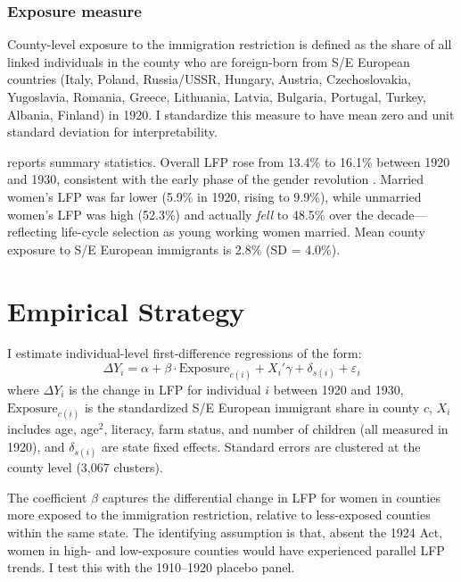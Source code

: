 \documentclass[12pt]{article}
\begin{document}
\subsubsection*{Exposure measure} County-level exposure to the immigration restriction is defined as the share of all linked individuals in the county who are foreign-born from S/E European countries (Italy, Poland, Russia/USSR, Hungary, Austria, Czechoslovakia, Yugoslavia, Romania, Greece, Lithuania, Latvia, Bulgaria, Portugal, Turkey, Albania, Finland) in 1920. I standardize this measure to have mean zero and unit standard deviation for interpretability.



 reports summary statistics. Overall LFP rose from 13.4\% to 16.1\% between 1920 and 1930, consistent with the early phase of the gender revolution \citep{Goldin2006}. Married women's LFP was far lower (5.9\% in 1920, rising to 9.9\%), while unmarried women's LFP was high (52.3\%) and actually \emph{fell} to 48.5\% over the decade---reflecting life-cycle selection as young working women married. Mean county exposure to S/E European immigrants is 2.8\% (SD = 4.0\%).


\section{Empirical Strategy}

I estimate individual-level first-difference regressions of the form:
\begin{equation}
\Delta Y_i = \alpha + \beta \cdot \text{Exposure}_{c(i)} + X_i'\gamma + \delta_{s(i)} + \varepsilon_i
\label{eq:main}
\end{equation}
where $\Delta Y_i$ is the change in LFP for individual $i$ between 1920 and 1930, $\text{Exposure}_{c(i)}$ is the standardized S/E European immigrant share in county $c$, $X_i$ includes age, age$^2$, literacy, farm status, and number of children (all measured in 1920), and $\delta_{s(i)}$ are state fixed effects. Standard errors are clustered at the county level (3,067 clusters).

The coefficient $\beta$ captures the differential change in LFP for women in counties more exposed to the immigration restriction, relative to less-exposed counties within the same state. The identifying assumption is that, absent the 1924 Act, women in high- and low-exposure counties would have experienced parallel LFP trends. I test this with the 1910--1920 placebo panel.
\end{document}
